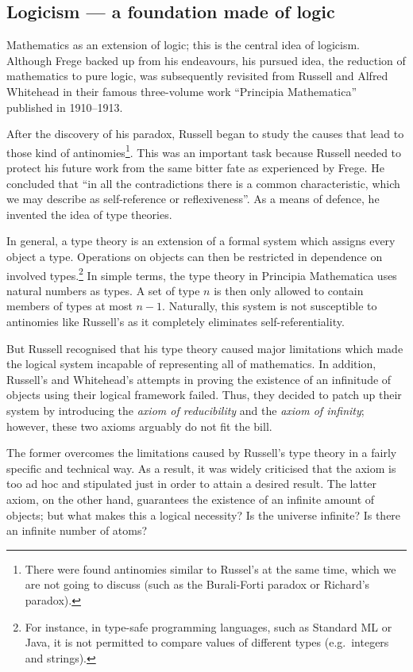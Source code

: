 \documentclass[hidelinks]{article}
\begin{document}
\subsection{Logicism --- a foundation made of logic}\label{ssec_logicism}
Mathematics as an extension of logic; this is the central idea of logicism. Although Frege backed up from his endeavours, his pursued idea, the reduction of mathematics to pure logic, was subsequently revisited from Russell and Alfred Whitehead in their famous three-volume work ``Principia Mathematica'' published in 1910--1913.

After the discovery of his paradox, Russell began to study the causes that lead to those kind of antinomies\footnote{There were found antinomies similar to Russel's at the same time, which we are not going to discuss (such as the Burali-Forti paradox or Richard's paradox).\cite{russell_self_referentiality}}. This was an important task because Russell needed to protect his future work from the same bitter fate as experienced by Frege. He concluded that ``in all the contradictions there is a common characteristic, which we may describe as self-reference or reflexiveness''\cite[p. 224]{russell_self_referentiality}. As a means of defence, he invented the idea of type theories. 

In general, a type theory is an extension of a formal system which assigns every object a type. Operations on objects can then be restricted in dependence on involved types.\footnote{For instance, in type-safe programming languages, such as Standard ML or Java, it is not permitted to compare values of different types (e.g.\ integers and strings).} In simple terms, the type theory in Principia Mathematica uses natural numbers as types. A set of type $n$ is then only allowed to contain members of types at most $n-1$. Naturally, this system is not susceptible to antinomies like Russell's as it completely eliminates self-referentiality. 

But Russell recognised that his type theory caused major limitations which made the logical system incapable of representing all of mathematics. In addition, Russell's and Whitehead's attempts in proving the existence of an infinitude of objects using their logical framework failed. Thus, they decided to patch up their system by introducing the \textit{axiom of reducibility} and the \textit{axiom of infinity}; however, these two axioms arguably do not fit the bill.

The former overcomes the limitations caused by Russell's type theory in a fairly specific and technical way. As a result, it was widely criticised that the axiom is too ad hoc and stipulated just in order to attain a desired result.
The latter axiom, on the other hand, guarantees the existence of an infinite amount of objects; but what makes this a logical necessity? Is the universe infinite? Is there an infinite number of atoms?
\end{document}
